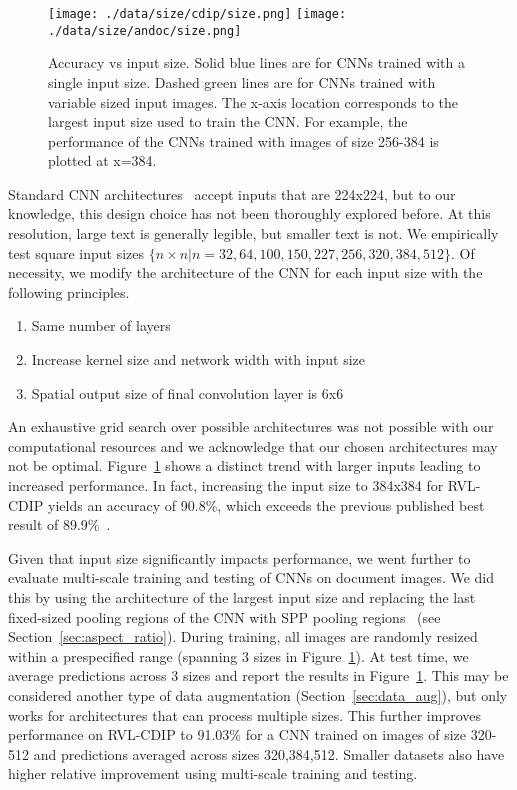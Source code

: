 \documentclass[10pt, conference, compsocconf]{IEEEtran}
\begin{document}
\begin{figure}

\texttt{[image: ./data/size/cdip/size.png]}
\texttt{[image: ./data/size/andoc/size.png]}

\caption{Accuracy vs input size.  Solid blue lines are for CNNs trained with a single input size. Dashed green lines are for CNNs trained with variable sized input images.  The x-axis location corresponds to the largest input size used to train the CNN.  For example, the performance of the CNNs trained with images of size 256-384 is plotted at x=384.}
\label{fig:input_size}
\end{figure}

Standard CNN architectures~\cite{krizhevsky12,simonyan14,he15residual} accept inputs that are 224x224, but to our knowledge, this design choice has not been thoroughly explored before.
At this resolution, large text is generally legible, but smaller text is not.
We empirically test square input sizes $\{n\times{}n | n = 32,64,100,150,227,256,320,384,512\}$.
Of necessity, we modify the architecture of the CNN for each input size with the following principles.
\begin{enumerate}
\item Same number of layers
\item Increase kernel size and network width with input size
\item Spatial output size of final convolution layer is 6x6
\end{enumerate}
An exhaustive grid search over possible architectures was not possible with our computational resources and we acknowledge that our chosen architectures may not be optimal.
Figure~\ref{fig:input_size} shows a distinct trend with larger inputs leading to increased performance.
In fact, increasing the input size to 384x384 for RVL-CDIP yields an accuracy of 90.8\%, which exceeds the previous published best result of 89.9\%~\cite{harley15}.




Given that input size significantly impacts performance, we went further to evaluate multi-scale training and testing of CNNs on document images.
We did this by using the architecture of the largest input size and replacing the last fixed-sized pooling regions of the CNN with SPP pooling regions~\cite{he15spatial} (see Section~\ref{sec:aspect_ratio}).
During training, all images are randomly resized within a prespecified range (spanning 3 sizes in Figure~\ref{fig:input_size}).
At test time, we average predictions across 3 sizes and report the results in Figure~\ref{fig:input_size}.
This may be considered another type of data augmentation (Section~\ref{sec:data_aug}), but only works for architectures that can process multiple sizes.
This further improves performance on RVL-CDIP to 91.03\% for a CNN trained on images of size 320-512 and predictions averaged across sizes 320,384,512.
Smaller datasets also have higher relative improvement using multi-scale training and testing.
\end{document}
